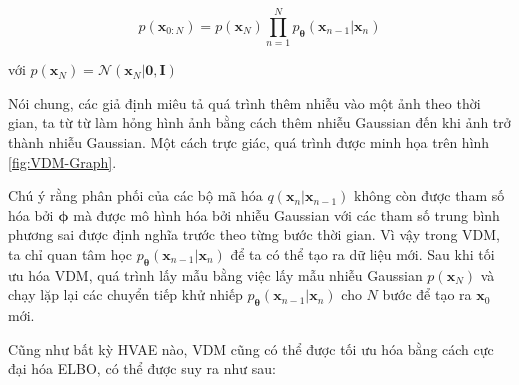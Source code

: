 \documentclass[14pt, a4paper]{article}
\numberwithin{equation}{section}
\numberwithin{figure}{section}
\numberwithin{dl}{section}
\numberwithin{md}{section}
\numberwithin{bd}{section}
\numberwithin{dn}{section}
\numberwithin{hq}{section}
\begin{document}
    \begin{equation} \label{eq:MHVAE-Joint-Distribution}
        p(\boldsymbol{x}_{0:N}) = p(\boldsymbol{x}_N) \prod_{n=1}^N p_{\boldsymbol{\theta}} (\boldsymbol{x}_{n-1} \vert \boldsymbol{x}_n)
    \end{equation}

    với $p(\boldsymbol{x}_N) = \mathcal{N} (\boldsymbol{x}_N \vert \boldsymbol{0}, \boldsymbol{I})$

    Nói chung, các giả định miêu tả quá trình thêm nhiễu vào một ảnh theo thời gian, ta từ từ làm hỏng hình ảnh bằng cách thêm nhiễu Gaussian đến khi ảnh trở thành nhiễu Gaussian.
    Một cách trực giác, quá trình được minh họa trên hình \ref{fig:VDM-Graph}.

    Chú ý rằng phân phối của các bộ mã hóa $q(\boldsymbol{x}_n \vert \boldsymbol{x}_{n-1})$ không còn được tham số hóa bởi $\boldsymbol{\phi}$ mà được mô hình hóa bởi nhiễu Gaussian với các tham số trung bình phương sai được định nghĩa trước theo từng bước thời gian.
    Vì vậy trong VDM, ta chỉ quan tâm học $p_{\boldsymbol{\theta}} (\boldsymbol{x}_{n-1} \vert \boldsymbol{x}_n)$ để ta có thể tạo ra dữ liệu mới.
    Sau khi tối ưu hóa VDM, quá trình lấy mẫu bằng việc lấy mẫu nhiễu Gaussian $p(\boldsymbol{x}_N)$ và chạy lặp lại các chuyển tiếp khử nhiếp $p_{\boldsymbol{\theta}} (\boldsymbol{x}_{n-1} \vert \boldsymbol{x}_n)$ cho $N$ bước để tạo ra $\boldsymbol{x}_0$ mới.

    Cũng như bất kỳ HVAE nào, VDM cũng có thể được tối ưu hóa bằng cách cực đại hóa ELBO, có thể được suy ra như sau:
\end{document}
